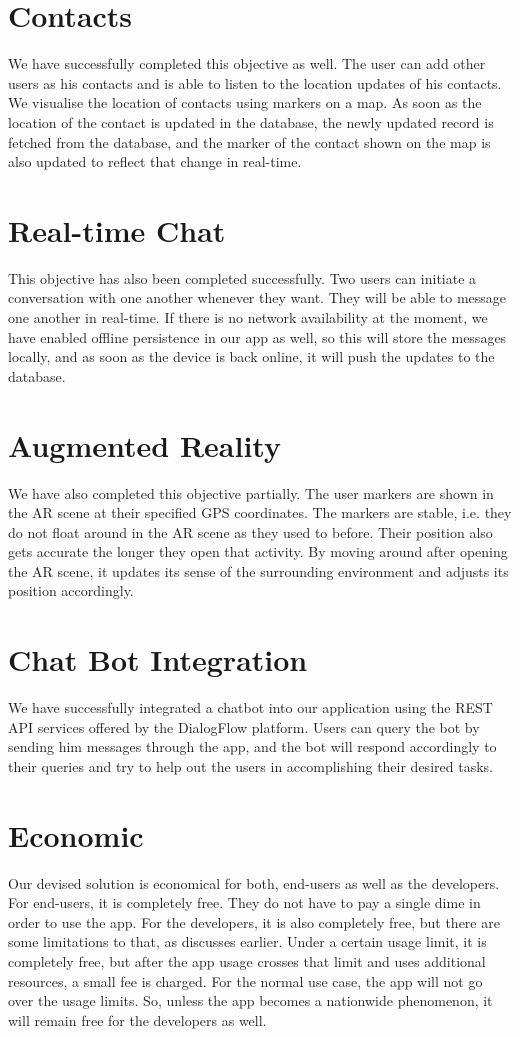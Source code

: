 \section{Contacts}
We have successfully completed this objective as well. The user can add other users as his contacts and is able to listen to the location updates of his contacts. We visualise the location of contacts using markers on a map. As soon as the location of the contact is updated in the database, the newly updated record is fetched from the database, and the marker of the contact shown on the map is also updated to reflect that change in real-time.

\section{Real-time Chat}
This objective has also been completed successfully. Two users can initiate a conversation with one another whenever they want. They will be able to message one another in real-time. If there is no network availability at the moment, we have enabled offline persistence in our app as well, so this will store the messages locally, and as soon as the device is back online, it will push the updates to the database.


\section{Augmented Reality}
We have also completed this objective partially. The user markers are shown in the AR scene at their specified GPS coordinates. The markers are stable, i.e. they do not float around in the AR scene as they used to before. Their position also gets accurate the longer they open that activity. By moving around after opening the AR scene, it updates its sense of the surrounding environment and adjusts its position accordingly.

\section{Chat Bot Integration}
We have successfully integrated a chatbot into our application using the REST API services offered by the DialogFlow platform. Users can query the bot by sending him messages through the app, and the bot will respond accordingly to their queries and try to help out the users in accomplishing their desired tasks.

\section{Economic}
Our devised solution is economical for both, end-users as well as the developers. For end-users, it is completely free. They do not have to pay a single dime in order to use the app. For the developers, it is also completely free, but there are some limitations to that, as discusses earlier. Under a certain usage limit, it is completely free, but after the app usage crosses that limit and uses additional resources, a small fee is charged. For the normal use case, the app will not go over the usage limits. So, unless the app becomes a nationwide phenomenon, it will remain free for the developers as well.


